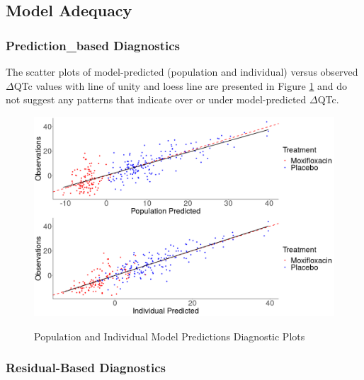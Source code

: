\documentclass[
]{article}
\begin{document}
\newpage

\captionsetup{justification = RaggedRight,singlelinecheck=false}


\label{tab:table.fit}

\hypertarget{model-adequacy-1}{%
\subsection{Model Adequacy}\label{model-adequacy-1}}

\hypertarget{prediction_based-diagnostics}{%
\subsubsection{Prediction\_based
Diagnostics}\label{prediction_based-diagnostics}}

The scatter plots of model-predicted (population and individual) versus
observed \(\Delta\)QTc values with line of unity and loess line are
presented in Figure \ref{fig:pred_ipred} and do not suggest any patterns
that indicate over or under model-predicted \(\Delta\)QTc.

\begin{figure}[H]
\caption{Population and Individual Model Predictions Diagnostic Plots} 
\includegraphics[width=\textwidth]{../Report/Figures/DV_pred_ipred.png}
\label{fig:pred_ipred}
\end{figure}

\hypertarget{residual-based-diagnostics}{%
\subsubsection{Residual-Based
Diagnostics}\label{residual-based-diagnostics}}
\end{document}
